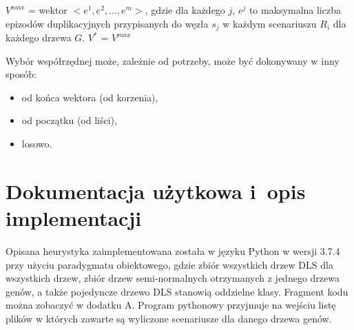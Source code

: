 \documentclass[licencjacka]{pracamgr}
\begin{document}
\begin{algorithm}[H]
 $V^{max}$ = wektor $<{e}^1,{e}^2, ... , {e}^m>$, gdzie dla każdego $j$, ${e}^j$ to maksymalna liczba epizodów duplikacyjnych przypisanych do węzła $s_j$ w każdym scenariuszu $R_i$ dla każdego drzewa $G$.\;
 $V^*$ = $V^{max}$\;

\end{algorithm}

Wybór współrzędnej może, zależnie od potrzeby, może być dokonywany w inny sposób:
\begin{itemize}
\item od końca wektora (od korzenia),
\item od początku (od liści),
\item losowo.
\end{itemize}

\section{Dokumentacja użytkowa i~opis implementacji}\label{r:impl}
Opisana heurystyka zaimplementowana została w języku Python w wersji 3.7.4 przy użyciu paradygmatu obiektowego, gdzie zbiór wszystkich drzew DLS dla wszystkich drzew, zbiór drzew semi-normalnych otrzymanych z jednego drzewa genów, a także pojedyncze drzewo DLS stanowią oddzielne klasy. Fragment kodu można zobaczyć w dodatku A. Program pythonowy przyjmuje na wejściu listę plików w których zawarte są wyliczone scenariusze dla danego drzewa genów.
\end{document}
